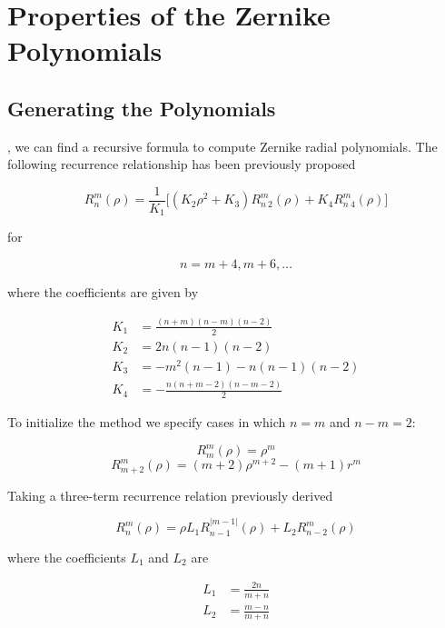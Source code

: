 \documentclass{tufte-handout}
\begin{document}
\section{Properties of the Zernike Polynomials}\label{sec:recursive}
\subsection{Generating the Polynomials}
, we can find a recursive formula to compute Zernike radial
polynomials\cite{honarvar2013recursive}.  The following recurrence relationship has been previously proposed\cite{kintner1976mathematical}

\begin{equation}
R_n^m(\rho)=\frac{1}{K_1}\Big[(K_2\rho^2+K_3)R_{n\ 2}^m (\rho)+K_4R_{n\
4}^m(\rho)\Big]
\end{equation}

for

$$n=m+4,m+6, \dots$$

where the coefficients are given by\cite{janssen2007computing}

\begin{align*}
K_1&=\frac{(n+m)(n-m)(n-2)}{2}\\
K_2&=2n(n-1)(n-2)\\
K_3&=-m^2(n-1)-n(n-1)(n-2)\\
K_4&=-\frac{n(n+m-2)(n-m-2)}{2}
\end{align*}

To initialize the method we specify cases in which $n=m$ and $n-m=2$:\cite{chong2003comparative}

\begin{equation}
R_m^m(\rho)=\rho^m
\end{equation}
\begin{equation}
R_{m+2}^m(\rho)=(m+2)\rho^{m+2}-(m+1)r^m
\end{equation}

Taking a three-term recurrence relation previously derived\cite{prata1989algorithm}

\begin{equation}
R_n^m(\rho)=\rho L_1R_{n-1}^{|m-1|}(\rho)+L_2R_{n-2}^m(\rho)
\end{equation}

where the coefficients $L_1$ and $L_2$ are

\begin{align*}
L_1&=\frac{2n}{m+n}\\
L_2&=\frac{m-n}{m+n}
\end{align*}
\end{document}
